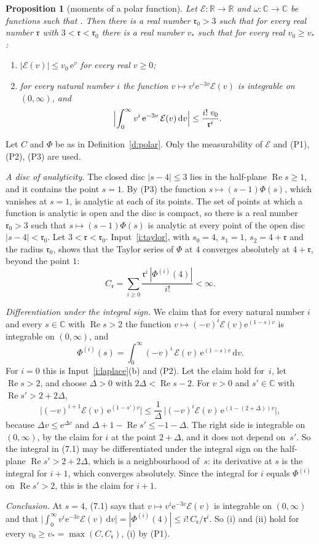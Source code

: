 \documentclass[11pt,a4paper]{article}
\makeatletter
\theoremstyle{plainx}
\newtheorem{proposition}[theorem]{Proposition}
\theoremstyle{uprightx}
\renewenvironment{proof}[1][Proof]{\par\pushQED{\qed}\normalfont\topsep0pt\partopsep0pt
  \trivlist\item[\hskip\labelsep\itshape #1.]\ignorespaces}{\popQED\endtrivlist\@endpefalse}
\newcommand{\C}{\mathbb{C}}
\newcommand{\RR}{\mathbb{R}}
\newcommand{\ee}{\mathrm{e}}
\newcommand{\dd}{\mathrm{d}}
\newcommand{\re}{\operatorname{Re}}
\newcommand{\cE}{\mathcal{E}}
\newcommand{\rr}{\mathfrak{r}}
\makeatother
\begin{document}
\begin{proposition}[moments of a polar function]\label{p:moments}
Let $\cE\colon\RR\to\RR$ and $\omega\colon\C\to\C$ be functions such that \polarWords{\cE}{\omega}. Then there is a
real number $\rr_0>3$ such that for every real number $\rr$ with $3<\rr<\rr_0$ there is a real number
$v_\ast$ such that for every real $v_0\ge v_\ast$:
\begin{enumerate}[label=(\roman*)]
\item $|\cE(v)|\le v_0\,\ee^{v}$ for every real $v\ge0$;
\item for every natural number $i$ the function $v\mapsto v^{i}\ee^{-3v}\cE(v)$ is integrable on $(0,\infty)$, and
\[\Bigl|\int_0^\infty v^{i}\,\ee^{-3v}\,\cE(v)\,\dd v\Bigr|\le\frac{i!\;v_0}{\rr^{i}}.\]
\end{enumerate}
\end{proposition}
\begin{proof}
Let $C$ and $\Phi$ be as in Definition~\ref{d:polar}. Only the measurability of $\cE$ and (P1), (P2), (P3) are used.

\emph{A disc of analyticity.} The closed disc $|s-4|\le3$ lies in the half-plane $\re s\ge1$, and it contains the
point $s=1$. By (P3) the function $s\mapsto(s-1)\Phi(s)$, which vanishes at $s=1$, is analytic at each of its
points. The set of points at which a function is analytic is open
and the disc is compact, so there is a real number $\rr_0>3$ such that $s\mapsto(s-1)\Phi(s)$ is analytic at every
point of the open disc $|s-4|<\rr_0$. Let $3<\rr<\rr_0$. Input~\ref{i:taylor}, with $s_0=4$, $s_1=1$, $s_2=4+\rr$
and the radius $\rr_0$, shows that the Taylor series of $\Phi$ at $4$ converges absolutely at $4+\rr$,
beyond the point $1$:
\[C_{\rr}=\sum_{i\ge0}\frac{\rr^{i}\,|\Phi^{(i)}(4)|}{i!}<\infty.\]

\emph{Differentiation under the integral sign.} We claim that for every natural number $i$ and every $s\in\C$ with
$\re s>2$ the function $v\mapsto(-v)^{i}\cE(v)\ee^{(1-s)v}$ is integrable on $(0,\infty)$, and
\[\Phi^{(i)}(s)=\int_0^\infty(-v)^{i}\,\cE(v)\,\ee^{(1-s)v}\,\dd v.\tag{7.1}\]
For $i=0$ this is Input~\ref{i:laplace}(b) and (P2). Let the claim hold for~$i$, let $\re s>2$, and choose
$\Delta>0$ with $2\Delta<\re s-2$. For $v>0$ and $s'\in\C$ with $\re s'>2+2\Delta$,
\[
\bigl|(-v)^{i+1}\cE(v)\,\ee^{(1-s')v}\bigr|\le\frac1{\Delta}\,\bigl|(-v)^{i}\cE(v)\,\ee^{(1-(2+\Delta))v}\bigr|,
\]
because $\Delta v\le\ee^{\Delta v}$ and $\Delta+1-\re s'\le-1-\Delta$. The right side is
integrable on $(0,\infty)$, by the claim for $i$ at the point $2+\Delta$, and it does not depend on~$s'$. So
the integral in (7.1) may be differentiated under the integral sign on the half-plane $\re s'>2+2\Delta$,
which is a neighbourhood of~$s$: its derivative at $s$ is the integral for $i+1$, which converges absolutely. Since
the integral for $i$ equals $\Phi^{(i)}$ on $\re s'>2$, this is the claim for $i+1$.

\emph{Conclusion.} At $s=4$, (7.1) says that $v\mapsto v^{i}\ee^{-3v}\cE(v)$ is integrable on $(0,\infty)$ and that
$\bigl|\int_0^\infty v^{i}\ee^{-3v}\cE(v)\,\dd v\bigr|=|\Phi^{(i)}(4)|\le i!\,C_{\rr}/\rr^{i}$. So (i) and (ii) hold for
every $v_0\ge v_\ast=\max(C,C_{\rr})$, (i) by (P1).
\end{proof}
\end{document}
